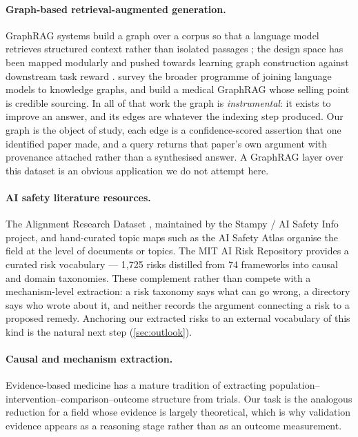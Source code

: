 \documentclass[10pt,twocolumn,letterpaper]{article}
\begin{document}
\paragraph{Graph-based retrieval-augmented generation.} GraphRAG systems build a graph
over a corpus so that a language model retrieves structured context rather than isolated
passages \citep{peng2024graphrag,sarmah2024hybridrag}; the design space has been mapped
modularly \citep{cao2024legographrag} and pushed towards learning graph construction
against downstream task reward \citep{tsang2025autographr1}. \citet{pan2024unifying}
survey the broader programme of joining language models to knowledge graphs, and
\citet{wu2025medgraphrag} build a medical GraphRAG whose selling point is credible
sourcing. In all of that work the graph is \emph{instrumental}: it exists to improve an
answer, and its edges are whatever the indexing step produced. Our graph is the object of
study, each edge is a confidence-scored assertion that one identified paper made, and a
query returns that paper's own argument with provenance attached rather than a
synthesised answer. A GraphRAG layer over this dataset is an obvious application we do
not attempt here.

\paragraph{AI safety literature resources.}
The Alignment Research Dataset \citep{kirchner2022ard}, maintained by the Stampy /
AI Safety Info project, and hand-curated topic maps such as the AI Safety Atlas organise
the field at the level of documents or topics. The MIT AI Risk Repository
\citep{slattery2026airisk} provides a curated risk vocabulary --- 1{,}725 risks distilled
from 74 frameworks into causal and domain taxonomies. These complement rather than
compete with a mechanism-level extraction: a risk taxonomy says what can go wrong, a
directory says who wrote about it, and neither records the argument connecting a risk to
a proposed remedy. Anchoring our extracted risks to an external vocabulary of this kind
is the natural next step (\cref{sec:outlook}).

\paragraph{Causal and mechanism extraction.}
Evidence-based medicine has a mature tradition of extracting
population--intervention--comparison--outcome structure from trials. Our task is the
analogous reduction for a field whose evidence is largely theoretical, which is why
validation evidence appears as a reasoning stage rather than as an outcome measurement.
\end{document}
